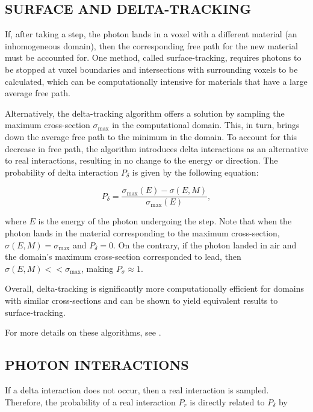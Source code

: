 \subsection{SURFACE AND DELTA-TRACKING}

\par If, after taking a step, the photon lands in a voxel with a different material (an inhomogeneous domain), then the corresponding free path for the new material must be accounted for. One method, called surface-tracking, requires photons to be stopped at voxel boundaries and intersections with surrounding voxels to be calculated, which can be computationally intensive for materials that have a large average free path. 
\par Alternatively, the delta-tracking algorithm offers a solution by sampling the maximum cross-section $\sigma_{\text{max}}$ in the computational domain. This, in turn, brings down the average free path to the minimum in the domain. To account for this decrease in free path, the algorithm introduces delta interactions as an alternative to real interactions, resulting in no change to the energy or direction. The probability of delta interaction $P_{\delta}$ is given by the following equation:

\begin{equation} \label{eq:4}
    P_{\delta} = \frac{\sigma_{\text{max}}(E) - \sigma(E, M)}{\sigma_{\text{max}}(E)},
\end{equation}

where $E$ is the energy of the photon undergoing the step. Note that when the photon lands in the material corresponding to the maximum cross-section, $\sigma(E, M) = \sigma_{\text{max}}$ and $P_{\delta} = 0$. On the contrary, if the photon landed in air and the domain's maximum cross-section corresponded to lead, then $\sigma(E, M) << \sigma_{\text{max}}$, making $P_{\sigma} \approx 1$.

\par Overall, delta-tracking is significantly more computationally efficient for domains with similar cross-sections and can be shown to yield equivalent results to surface-tracking.

\par For more details on these algorithms, see \cite{vassiliev_monte_2017}.

\subsection{PHOTON INTERACTIONS}
If a delta interaction does not occur, then a real interaction is sampled. Therefore, the probability of a real interaction $P_r$ is directly related to $P_\delta$ by

